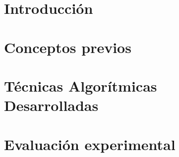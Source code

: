 \documentclass[spanish,a4paper,14pt,oneside]{extreport}
\begin{document}
\renewcommand{\thepage}{\roman{page}}
\setcounter{page}{1}


\tableofcontents

\newpage{\pagestyle{empty}}

\listoffigures

\newpage{\pagestyle{empty}}

\listoftables

\newpage{\pagestyle{empty}}

\renewcommand{\thepage}{\arabic{page}}
\setcounter{page}{1}


\chapter{Introducción}
\label{chapter:intro}




\chapter{Conceptos previos}
\label{chapter:dos}


\newpage{\pagestyle{empty}}
\thispagestyle{empty}

\chapter{Técnicas Algorítmicas Desarrolladas}
\label{chapter:tres}




\chapter{Evaluación experimental}
\label{chapter:cuatro}
\end{document}
